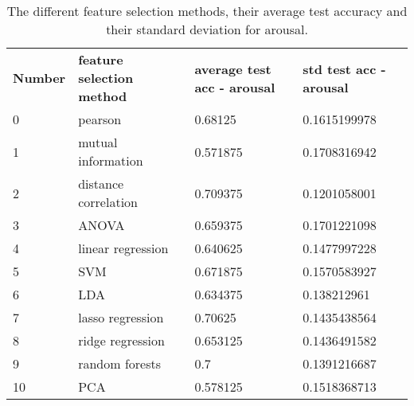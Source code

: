 \begin{table}[H]
\centering
\begin{tabular}{llll}
\textbf{Number} & \textbf{feature selection method} & \textbf{average test acc - arousal} & \textbf{std test acc - arousal} \\
0               & pearson                           & 0.68125                             & 0.1615199978                    \\
1               & mutual information                & 0.571875                            & 0.1708316942                    \\
2               & distance correlation              & 0.709375                            & 0.1201058001                    \\
3               & ANOVA                             & 0.659375                            & 0.1701221098                    \\
4               & linear regression                 & 0.640625                            & 0.1477997228                    \\
5               & SVM                               & 0.671875                            & 0.1570583927                    \\
6               & LDA                               & 0.634375                            & 0.138212961                     \\
7               & lasso regression                  & 0.70625                             & 0.1435438564                    \\
8               & ridge regression                  & 0.653125                            & 0.1436491582                    \\
9               & random forests                    & 0.7                                 & 0.1391216687                    \\
10              & PCA                               & 0.578125                            & 0.1518368713                   
\end{tabular}
\caption{The different feature selection methods, their average test accuracy and their standard deviation for arousal\label{accCompLblarousal}.}
\end{table}


